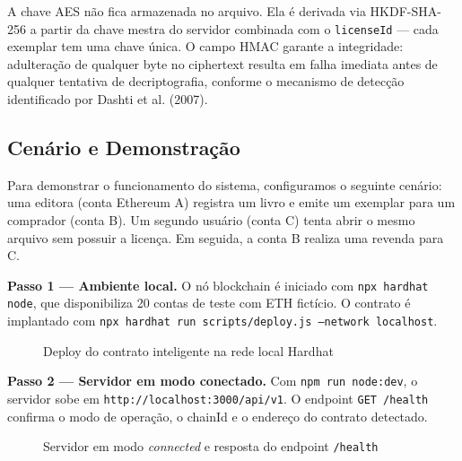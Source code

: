 \documentclass[12pt]{article}
\begin{document}
A chave AES não fica armazenada no arquivo. Ela é derivada via HKDF-SHA-256 a partir da chave mestra do servidor combinada com o \texttt{licenseId} — cada exemplar tem uma chave única. O campo HMAC garante a integridade: adulteração de qualquer byte no ciphertext resulta em falha imediata antes de qualquer tentativa de decriptografia, conforme o mecanismo de detecção identificado por Dashti et al. (2007).

\subsection{Cenário e Demonstração}

Para demonstrar o funcionamento do sistema, configuramos o seguinte cenário: uma editora (conta Ethereum A) registra um livro e emite um exemplar para um comprador (conta B). Um segundo usuário (conta C) tenta abrir o mesmo arquivo sem possuir a licença. Em seguida, a conta B realiza uma revenda para C.

\textbf{Passo 1 — Ambiente local.} O nó blockchain é iniciado com \texttt{npx hardhat node}, que disponibiliza 20 contas de teste com ETH fictício. O contrato é implantado com \texttt{npx hardhat run scripts/deploy.js --network localhost}.

\begin{figure}[H]
\centering
\caption{Deploy do contrato inteligente na rede local Hardhat}
\label{fig:deploy}
\end{figure}

\textbf{Passo 2 — Servidor em modo conectado.} Com \texttt{npm run node:dev}, o servidor sobe em \texttt{http://localhost:3000/api/v1}. O endpoint \texttt{GET /health} confirma o modo de operação, o chainId e o endereço do contrato detectado.

\begin{figure}[H]
\centering
\caption{Servidor em modo \textit{connected} e resposta do endpoint \texttt{/health}}
\label{fig:health}
\end{figure}
\end{document}
